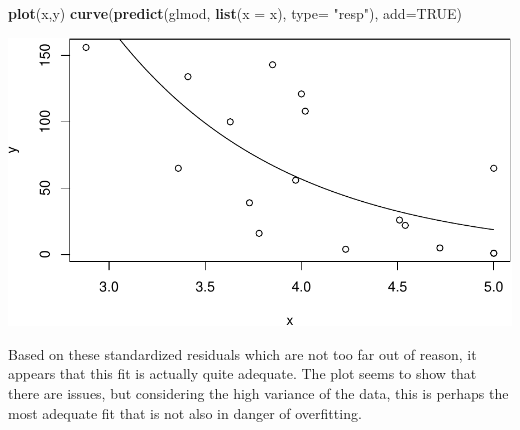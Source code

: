 \documentclass[]{article}
\newenvironment{Shaded}{\begin{snugshade}}{\end{snugshade}}
\newcommand{\KeywordTok}[1]{\textcolor[rgb]{0.13,0.29,0.53}{\textbf{{#1}}}}
\newcommand{\DataTypeTok}[1]{\textcolor[rgb]{0.13,0.29,0.53}{{#1}}}
\newcommand{\StringTok}[1]{\textcolor[rgb]{0.31,0.60,0.02}{{#1}}}
\newcommand{\OtherTok}[1]{\textcolor[rgb]{0.56,0.35,0.01}{{#1}}}
\newcommand{\NormalTok}[1]{{#1}}
\begin{document}
\begin{Shaded}
\begin{Highlighting}[]
\KeywordTok{plot}\NormalTok{(x,y)}
\KeywordTok{curve}\NormalTok{(}\KeywordTok{predict}\NormalTok{(glmod, }\KeywordTok{list}\NormalTok{(}\DataTypeTok{x =} \NormalTok{x), }\DataTypeTok{type=} \StringTok{"resp"}\NormalTok{), }\DataTypeTok{add=}\OtherTok{TRUE}\NormalTok{)}
\end{Highlighting}
\end{Shaded}

\includegraphics{ExercisesWithSolutions_files/figure-latex/unnamed-chunk-8-1.pdf}

Based on these standardized residuals which are not too far out of
reason, it appears that this fit is actually quite adequate. The plot
seems to show that there are issues, but considering the high variance
of the data, this is perhaps the most adequate fit that is not also in
danger of overfitting.
\end{document}

